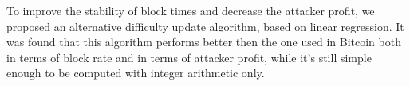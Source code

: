 \documentclass[]{llncs}
\begin{document}
To improve the stability of block times and decrease the attacker profit, we proposed an alternative difficulty update algorithm, based on linear regression. It was found that this algorithm performs better then the one used in Bitcoin both in terms of block rate and in terms of attacker profit, while it's still simple enough to be computed with integer arithmetic only.




\end{document}
